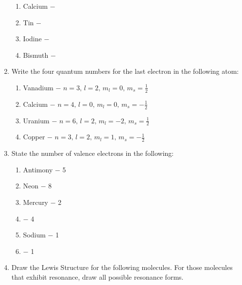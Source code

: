 \documentclass[12pt]{article}
\begin{document}
\begin{enumerate}
\begin{enumerate}
      \item Calcium $-$ 

      \item Tin $-$ 

      \item Iodine $-$ 

      \item Bismuth $-$  

    \end{enumerate}

  \item Write the four quantum numbers for the last electron in the following atom:

    \begin{enumerate}

      \item Vanadium $-$ $n=3,\,l=2,\,m_l=0,\,m_s=\frac{1}{2}$

      \item Calcium $-$ $n=4,\,l=0,\,m_l=0,\,m_s=-\frac{1}{2}$ 

      \item Uranium $-$ $n=6,\,l=2,\,m_l=-2,\,m_s=\frac{1}{2}$ 

      \item Copper $-$ $n=3,\,l=2,\,m_l=1,\,m_s=-\frac{1}{2}$ 

    \end{enumerate}

  \item State the number of valence electrons in the following: 

    \begin{enumerate}

      \item Antimony $-$ 5

      \item Neon $-$ 8

      \item Mercury $-$ 2 

      \item {} $-$ 4

      \item Sodium $-$ 1

      \item {} $-$ 1

    \end{enumerate}

  \item Draw the Lewis Structure for the following molecules. For those molecules that exhibit resonance, draw all possible resonance forms.


\end{enumerate}
\end{document}
